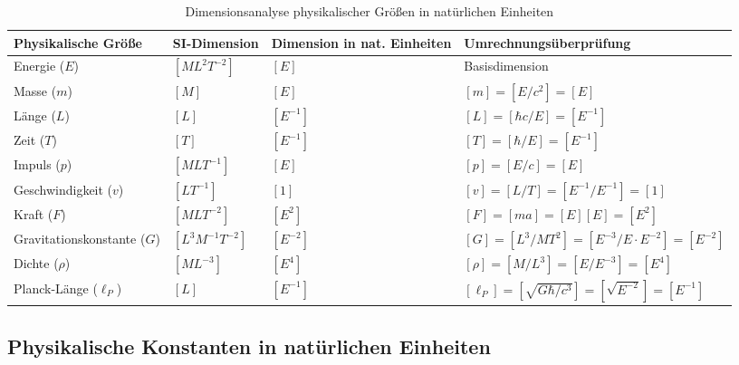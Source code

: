 \documentclass[12pt,a4paper]{article}
\begin{document}
	\begin{table}[htbp]
		\footnotesize
		\centering
		\begin{tabular}{p{3cm}p{2.5cm}p{2cm}p{7cm}}
			\toprule
			\textbf{Physikalische Größe} & \textbf{SI-Dimension} & \textbf{Dimension in nat. Einheiten} & \textbf{Umrechnungsüberprüfung} \\
			\midrule
			Energie ($E$) & $[ML^2T^{-2}]$ & $[E]$ & Basisdimension \checkmark \\
			Masse ($m$) & $[M]$ & $[E]$ & $[m] = [E/c^2] = [E]$ \checkmark \\
			Länge ($L$) & $[L]$ & $[E^{-1}]$ & $[L] = [\hbar c/E] = [E^{-1}]$ \checkmark \\
			Zeit ($T$) & $[T]$ & $[E^{-1}]$ & $[T] = [\hbar/E] = [E^{-1}]$ \checkmark \\
			Impuls ($p$) & $[MLT^{-1}]$ & $[E]$ & $[p] = [E/c] = [E]$ \checkmark \\
			Geschwindigkeit ($v$) & $[LT^{-1}]$ & $[1]$ & $[v] = [L/T] = [E^{-1}/E^{-1}] = [1]$ \checkmark \\
			Kraft ($F$) & $[MLT^{-2}]$ & $[E^2]$ & $[F] = [ma] = [E][E] = [E^2]$ \checkmark \\
			Gravitationskonstante ($G$) & $[L^3M^{-1}T^{-2}]$ & $[E^{-2}]$ & $[G] = [L^3/MT^2] = [E^{-3}/E \cdot E^{-2}] = [E^{-2}]$ \checkmark \\
			Dichte ($\rho$) & $[ML^{-3}]$ & $[E^4]$ & $[\rho] = [M/L^3] = [E/E^{-3}] = [E^4]$ \checkmark \\
			Planck-Länge ($\ell_P$) & $[L]$ & $[E^{-1}]$ & $[\ell_P] = [\sqrt{G\hbar/c^3}] = [\sqrt{E^{-2}}] = [E^{-1}]$ \checkmark \\
			\bottomrule
		\end{tabular}
		\caption{Dimensionsanalyse physikalischer Größen in natürlichen Einheiten}
	\end{table}
	
	\subsection{Physikalische Konstanten in natürlichen Einheiten}
	
\end{document}
